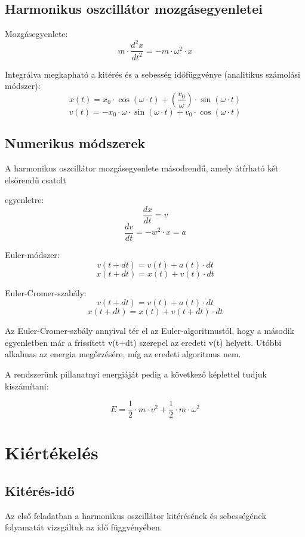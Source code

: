 \documentclass[a4paper,12pt]{article}
\begin{document}
\subsection{Harmonikus oszcillátor mozgásegyenletei}

Mozgásegyenlete:
$$m \cdot \dfrac{d^2x}{dt^2}=-m \cdot {\omega}^2 \cdot x$$

Integrálva megkapható a kitérés és a sebesség időfüggvénye (analitikus számolási módszer):
$$x(t) = x_0 \cdot \cos(\omega \cdot t) + (\frac{v_0}{\omega}) \cdot \sin(\omega \cdot t)$$
$$v(t) = -x_0 \cdot \omega \cdot \sin(\omega \cdot t) + v_0 \cdot \cos(\omega \cdot t)$$

\subsection{Numerikus módszerek}

A harmonikus oszcillátor mozgásegyenlete másodrendű, amely átírható két elsőrendű csatolt

egyenletre:
$$\frac{dx}{dt}=v$$
$$\frac{dv}{dt}=-w^2 \cdot x = a$$

\newpage

Euler-módszer:
$$v(t+dt)=v(t) + a(t) \cdot dt$$
$$x(t+dt)=x(t)+v(t) \cdot dt$$

Euler-Cromer-szabály:
$$v(t+dt)=v(t) + a(t) \cdot dt$$
$$x(t+dt)=x(t)+v(t+dt) \cdot dt$$

Az Euler-Cromer-szbály annyival tér el az Euler-algoritmustól, hogy a második egyenletben már a frissített v(t+dt) szerepel az eredeti v(t) helyett. Utóbbi alkalmas az energia megőrzésére, míg az eredeti algoritmus nem.

A rendszerünk pillanatnyi energiáját pedig a következő képlettel tudjuk kiszámítani:

$$E=\frac{1}{2} \cdot m \cdot v^2 + \frac{1}{2} \cdot m \cdot \omega^2$$

\newpage

\section{Kiértékelés}

\subsection{Kitérés-idő}

Az első feladatban a harmonikus oszcillátor kitérésének és sebességének folyamatát vizsgáltuk az idő függvényében.
\end{document}
